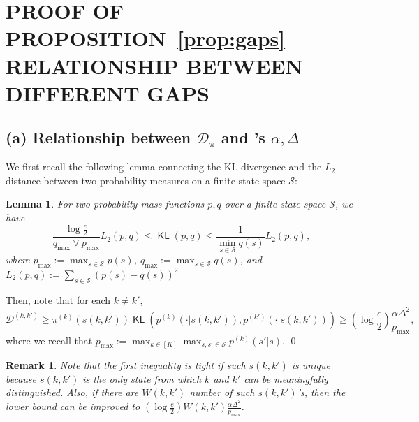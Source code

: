 \documentclass[twoside]{article}
\DeclareMathOperator{\KL}{{\mathsf{KL}}}
\def\gD{{\mathcal{D}}}
\def\gS{{\mathcal{S}}}
\theoremstyle{plain}
\newtheorem{lemma}{Lemma}[section]
\newtheorem{remark}{Remark}
\begin{document}
\newpage
\section{\texorpdfstring{PROOF OF PROPOSITION~\ref{prop:gaps} -- RELATIONSHIP BETWEEN DIFFERENT GAPS}{PROOF OF PROPOSITION 5.1 -- RELATIONSHIP BETWEEN DIFFERENT GAPS}}
\label{app:gaps}

\subsection{\texorpdfstring{(a) Relationship between $\gD_\pi$ and \citet{kausik2023mixture}'s $\alpha, \Delta$}{(a) Relationship between KL-based Separation and Kausik et al. (2023)'s L2-based Separation}}
We first recall the following lemma connecting the KL divergence and the $L_2$-distance between two probability measures on a finite state space $\gS$:
\begin{lemma}
\label{lem:KL-L2}
    For two probability mass functions $p, q$ over a finite state space $\gS$, we have
    \begin{equation}
        \frac{\log\frac{e}{2}}{q_{\max} \vee p_{\max}} L_2(p, q) \leq \KL(p, q) \leq \frac{1}{\min_{s \in \gS} q(s)} L_2(p, q),
    \end{equation}
    where $p_{\max} := \max_{s \in \gS} p(s)$, $q_{\max} := \max_{s \in \gS} q(s)$, and $L_2(p, q) := \sum_{s \in \gS} (p(s) - q(s))^2$
\end{lemma}
Then, note that for each $k \neq k'$,
\begin{equation*}
    \gD^{(k,k')} \geq \pi^{(k)}(s(k, k')) \KL\left( p^{(k)}(\cdot | s(k, k')), p^{(k')}(\cdot | s(k, k')) \right)
    \geq \left( \log\frac{e}{2} \right) \frac{\alpha \Delta^2}{p_{\max}},
\end{equation*}
where we recall that $p_{\max} := \max_{k \in [K]} \max_{s, s' \in \gS} p^{(k)}(s' | s)$.
\qed

\begin{remark}
    Note that the first inequality is tight if such $s(k, k')$ is unique because $s(k, k')$ is the only state from which $k$ and $k'$ can be meaningfully distinguished.
    Also, if there are $W(k, k')$ number of such $s(k,k')$'s, then the lower bound can be improved to $\left(\log\frac{e}{2}\right) W(k, k') \frac{\alpha \Delta^2}{p_{\max}}$.
\end{remark}
\end{document}
